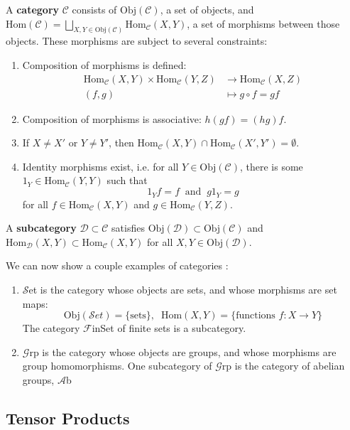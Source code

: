 \documentclass[11pt, reqno]{amsart}
\theoremstyle{plain}
\theoremstyle{definition}
\theoremstyle{example}
\def\Hom{\mathrm{Hom}}
\def\Obj{\mathrm{Obj}}
\begin{document}
\par
A \textbf{category} $\mathcal{C}$ consists of $\Obj(\mathcal{C})$, a set of objects, and $\Hom(\mathcal{C}) = \bigsqcup_{X, Y \in \Obj(\mathcal{C})} \Hom_{\mathcal{C}}(X, Y)$, a set of morphisms between those objects. These morphisms are subject to several constraints:
\begin{enumerate}
\item Composition of morphisms is defined:
\begin{align*}
\Hom_{\mathcal{C}}(X, Y) \times \Hom_{\mathcal{C}}(Y, Z) &\to \Hom_{\mathcal{C}}(X, Z)\\
(f, g) &\mapsto g \circ f = gf
\end{align*}
\item Composition of morphisms is associative: $h(gf) = (hg)f$.
\item If $X \neq X'$ or $Y \neq Y'$, then $\Hom_{\mathcal{C}}(X, Y) \cap \Hom_{\mathcal{C}}(X', Y') = \emptyset$.
\item Identity morphisms exist, i.e. for all $Y \in \Obj(\mathcal{C})$, there is some $1_{Y} \in \Hom_{\mathcal{C}}(Y, Y)$ such that $$1_{Y}f = f \; \; \text{and} \; \; g1_{Y} = g$$ for all $f \in \Hom_{\mathcal{C}}(X, Y)$ and $g \in \Hom_{\mathcal{C}}(Y, Z)$.
\end{enumerate}

A \textbf{subcategory} $\mathcal{D} \subset \mathcal{C}$ satisfies $\Obj(\mathcal{D}) \subset \Obj(\mathcal{C})$ and $\Hom_{\mathcal{D}}(X, Y) \subset \Hom_{\mathcal{C}}(X, Y)$ for all $X, Y \in \Obj(\mathcal{D})$.

\par
We can now show a couple examples of categories \cite[Lec. 15, p. 6]{dau}:
\begin{enumerate}
\item $\mathcal{S}$et is the category whose objects are sets, and whose morphisms are set maps: $$\Obj(\mathcal{S}et) = \{ \text{sets} \}, \; \; \Hom(X, Y) = \{\text{functions } f: X \to Y\}$$ The category $\mathcal{F}$inSet of finite sets is a subcategory.
\item $\mathcal{G}$rp is the category whose objects are groups, and whose morphisms are group homomorphisms. One subcategory of $\mathcal{G}$rp is the category of abelian groups, $\mathcal{A}$b
\end{enumerate}


\subsection{Tensor Products}
\end{document}
